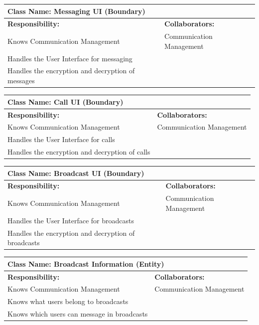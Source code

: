 \documentclass[]{article}
\begin{document}
	\begin{table}[ht]
		\centering
		\begin{tabular}{|p{7cm}|p{7cm}|}
		\hline 
			\multicolumn{2}{|l|}{\textbf{Class Name:} Messaging UI (Boundary)} \\
		\hline
		\textbf{Responsibility:} & \textbf{Collaborators:} \\
		\hline
		Knows Communication Management & Communication Management\\
		Handles the User Interface for messaging & \\
		Handles the encryption and decryption of messages & \\
		\hline
		\end{tabular}
	\end{table}

	\begin{table}[ht]
		\centering
		\begin{tabular}{|p{7cm}|p{7cm}|}
		\hline 
			\multicolumn{2}{|l|}{\textbf{Class Name:} Call UI (Boundary)} \\
		\hline
		\textbf{Responsibility:} & \textbf{Collaborators:} \\
		\hline
		Knows Communication Management & Communication Management\\
		Handles the User Interface for calls & \\
		Handles the encryption and decryption of calls & \\
		\hline
		\end{tabular}
	\end{table}

	\begin{table}[ht]
		\centering
		\begin{tabular}{|p{7cm}|p{7cm}|}
		\hline 
			\multicolumn{2}{|l|}{\textbf{Class Name:} Broadcast UI (Boundary)} \\
		\hline
		\textbf{Responsibility:} & \textbf{Collaborators:} \\
		\hline
		Knows Communication Management & Communication Management\\
		Handles the User Interface for broadcasts & \\
		Handles the encryption and decryption of broadcasts & \\
		\hline
		\end{tabular}
	\end{table}

	\begin{table}[ht]
		\centering
		\begin{tabular}{|p{7cm}|p{7cm}|}
		\hline 
			\multicolumn{2}{|l|}{\textbf{Class Name:} Broadcast Information (Entity)} \\
		\hline
		\textbf{Responsibility:} & \textbf{Collaborators:} \\
		\hline
		Knows Communication Management & Communication Management\\
		Knows what users belong to broadcasts & \\
		Knows which users can message in broadcasts & \\
		\hline
		\end{tabular}
	\end{table}
\end{document}
